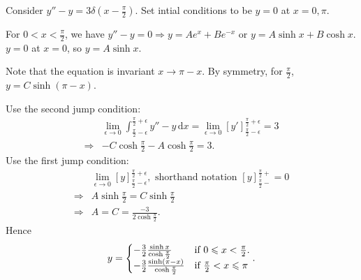 \documentclass[10pt]{article}
\def\le{\leqslant}
\begin{document}
      \begin{example}
          Consider $ y''-y=3\delta(x-\frac{\pi}{2}) $. Set intial conditions to be $ y=0 $ at $ x=0,\pi $.

          For $ 0<x< \frac{\pi}{2} $, we have $ y''-y=0 \Rightarrow y=Ae^x+Be^{-x} $ or $ y= A \sinh x+B \cosh x $. $ y=0 $ at $x=0$, so $ y=A \sinh x $.

          Note that the equation is invariant $ x\to \pi-x $. By symmetry, for $ \frac{\pi}{2} $, $ y=C \sinh (\pi-x) $.

          Use the second jump condition:
          \[
              \begin{aligned}
                &\lim_{\epsilon \to 0} \int_{\frac{\pi}{2}-\epsilon}^{\frac{\pi}{2}+\epsilon} y''-y \,\mathrm{d}x = \lim_{\epsilon \to 0} [y']_{\frac{\pi}{2}-\epsilon}^{\frac{\pi}{2}+\epsilon} = 3\\
                \Longrightarrow & -C \cosh \frac{\pi}{2}-A \cosh \frac{\pi}{2}=3.
              \end{aligned}
          \]
          Use the first jump condition:
          \[
              \begin{aligned}
                &\lim_{\epsilon \to 0} [y]_{\frac{\pi}{2}-\epsilon}^{\frac{\pi}{2}+\epsilon}, \text{ shorthand notation } [y]^{\frac{\pi}{2}+}_{\frac{\pi}{2}-}=0\\
                \Longrightarrow & A \sinh \frac{\pi}{2}=C \sinh \frac{\pi}{2}\\
                \Longrightarrow & A=C=\frac{-3}{2\cosh \frac{\pi}{2}}.
              \end{aligned}
          \]
          Hence 
          \[
              y= \begin{cases}
              -\frac{3}{2}\frac{\sinh x}{\cosh \frac{\pi}{2}} &\text{if $ 0\le x<\frac{\pi}{2} $.}\\
              -\frac{3}{2}\frac{\sinh (\pi -x)}{\cosh \frac{\pi}{2}}&\text{if $ \frac{\pi}{2}<x\le \pi $}\\
              \end{cases} 
          .\]
          \begin{center}
          \end{center}
      \end{example}
\end{document}
